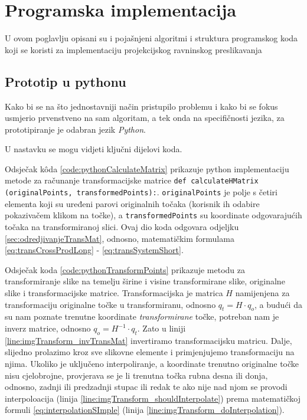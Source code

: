 \chapter{Programska implementacija}
\label{ch:implementacija}

U ovom poglavlju opisani su i pojašnjeni algoritmi i struktura programskog koda koji se koristi za implementaciju projekcijskog ravninskog preslikavanja

\section{Prototip u pythonu}
\label{sec:pythonProto}
\lstset{
	language=Python, 
	tabsize=2,
	numbers=left,
	breaklines=true,
	basicstyle=\ttfamily,
	columns=fixed
}

Kako bi se na što jednostavniji način pristupilo problemu i kako bi se fokus usmjerio prvenstveno na sam algoritam, a tek onda na specifičnosti jezika, za prototipiranje je odabran jezik \textit{Python}.

U nastavku se mogu vidjeti ključni dijelovi koda.



Odsječak kôda \ref{code:pythonCalculateMatrix} prikazuje python implementaciju metode za računanje transformacijske matrice \lstinline!def calculateHMatrix (originalPoints, transformedPoints):!. \lstinline!originalPoints! je polje s četiri elementa koji su uređeni parovi originalnih točaka (korisnik ih odabire pokazivačem klikom na točke), a \lstinline!transformedPoints! su koordinate odgovarajućih točaka na transformiranoj slici. Ovaj dio koda odgovara odjeljku \ref{sec:odredjivanjeTransMat}, odnosno, matematičkim formulama \eqref{eq:transCrossProdLong} - \eqref{eq:transSystemShort}.



Odsječak koda \ref{code:pythonTransformPoints} prikazuje metodu za transformiranje slike na temelju širine i visine transformirane slike, originalne slike i transformacijske matrice. Transformacijska je matrica $H$ namijenjena za transformaciju originalne točke u transformiranu, odnosno $q_t = H \cdot q_o$, a budući da su nam poznate trenutne koordinate \emph{transformirane} točke, potreban nam je inverz matrice, odnosno $q_o = H^{-1} \cdot q_t$. Zato u liniji \ref{line:imgTransform_invTransMat} invertiramo transformacijsku matricu. Dalje, slijedno prolazimo kroz sve slikovne elemente i primjenjujemo transformaciju na njima. Ukoliko je uključeno interpoliranje, a koordinate trenutno originalne točke nisu cjelobrojne, provjerava se je li trenutna točka rubna desna ili donja, odnosno, zadnji ili predzadnji stupac ili redak te ako nije nad njom se provodi interpoloacija (linija \ref{line:imgTransform_shouldInterpolate}) prema matematičkoj formuli \eqref{eq:interpolationSImple} (linija \ref{line:imgTransform_doInterpolation}).

